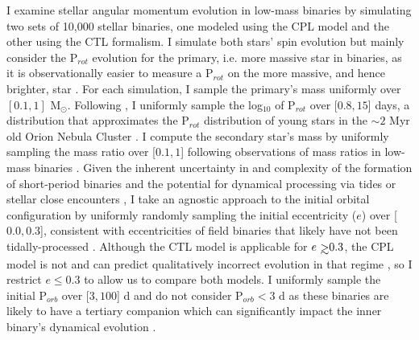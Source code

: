 I examine stellar angular momentum evolution in low-mass binaries by simulating two sets of 10,000 stellar binaries, one modeled using the CPL model and the other using the CTL formalism.  I simulate both stars' spin evolution but mainly consider the P$_{rot}$ evolution for the primary, i.e. more massive star in binaries, as it is observationally easier to measure a P$_{rot}$ on the more massive, and hence brighter, star \citep[e.g.][]{Meibom2006,Lurie2017}. For each simulation, I sample the primary's mass uniformly over $[0.1, 1]$ M$_{\odot}$. Following \citet{Matt2015}, I uniformly sample the log$_{10}$ of P$_{rot}$ over [$0.8,15$] days, a distribution that approximates the P$_{rot}$ distribution of young stars in the ${\sim}2$ Myr old Orion Nebula Cluster \citep{Stassun1999,Herbst2001,Herbst2002,Rodriguez-Ledesma2009}.  I compute the secondary star's mass by uniformly sampling the mass ratio over [$0.1, 1$] following observations of mass ratios in low-mass binaries \citep{Raghavan2010,Moe2018}. Given the inherent uncertainty in and complexity of the formation of short-period binaries \citep[e.g.][]{Bonnell1994,Bate2000,Bate2002,Moe2018} and the potential for dynamical processing via tides or stellar close encounters \citep[e.g.][]{Mardling2001,Hurley2002,Ivanova2005,Meibom2005}, I take an agnostic approach to the initial orbital configuration by uniformly randomly sampling the initial eccentricity ($e$) over [$0.0,0.3$], consistent with eccentricities of field binaries that likely have not been tidally-processed \citep{Raghavan2010}. Although the CTL model is applicable for $e \gsim 0.3$, the CPL model is not and can predict qualitatively incorrect evolution in that regime \citep[see Section 4.1 in][]{Leconte2010}, so I restrict $e \leq 0.3$ to allow us to compare both models. I uniformly sample the initial P$_{orb}$ over [$3,100$] d and do not consider P$_{orb} < 3$ d as these binaries are likely to have a tertiary companion \citep{Tokovinin2006} which can significantly impact the inner binary's dynamical evolution \citep[e.g.][]{Fabrycky2007,Munoz2015,Martin2015b,Hamers2016,Moe2018}. 

